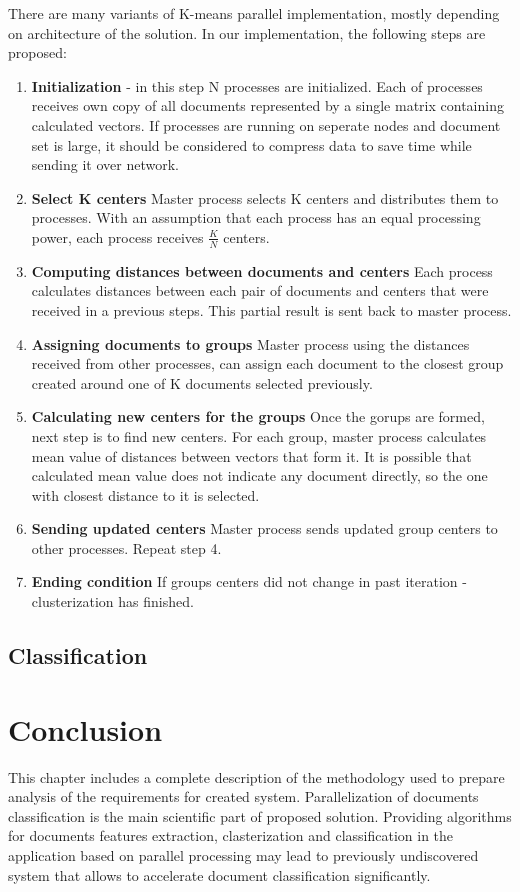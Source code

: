 There are many variants of K-means parallel implementation, mostly depending on architecture of the solution. In our implementation, the following steps are proposed:

\begin{enumerate}
	\item \textbf{Initialization} - in this step N processes are initialized.
	Each of processes receives own copy of all documents represented by a single matrix containing calculated vectors. If processes are running on seperate nodes and document set is large, it should be considered to compress data to save time while sending it over network.
	
	\item \textbf{Select K centers}
	Master process selects K centers and distributes them to processes. With an assumption that each process has an equal processing power, each process receives \(\frac{K}{N}\) centers.
	
	\item \textbf{Computing distances between documents and centers}
	Each process calculates distances between each pair of documents and centers that were received in a previous steps. This partial result is sent back to master process.
	
	\item \textbf{Assigning documents to groups}
	Master process using the distances received from other processes, can assign each document to the closest group created around one of K documents selected previously.
	
	\item \textbf{Calculating new centers for the groups}
	Once the gorups are formed, next step is to find new centers. For each group, master process calculates mean value of distances between vectors that form it. It is possible that calculated mean value does not indicate any document directly, so the one with closest distance to it is selected.
	
	\item \textbf{Sending updated centers}
	Master process sends updated group centers to other processes. Repeat step 4.
	
	\item \textbf{Ending condition}
	If groups centers did not change in past iteration - clusterization has finished.
\end{enumerate}

\subsection{Classification}

\section{Conclusion}
This chapter includes a complete description of the methodology used to prepare analysis of the requirements for created system. Parallelization of documents classification is the main scientific part of proposed solution. Providing algorithms for documents features extraction, clasterization and classification in the application based on parallel processing may lead to previously undiscovered system that allows to accelerate document classification significantly. 
